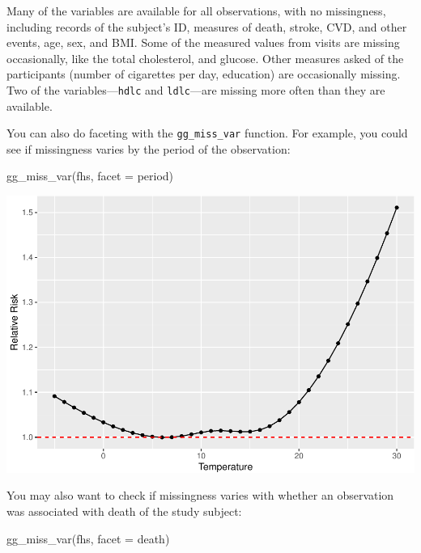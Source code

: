 \documentclass[
]{book}
\newenvironment{Shaded}{\begin{snugshade}}{\end{snugshade}}
\newcommand{\AttributeTok}[1]{\textcolor[rgb]{0.77,0.63,0.00}{#1}}
\newcommand{\FunctionTok}[1]{\textcolor[rgb]{0.00,0.00,0.00}{#1}}
\newcommand{\NormalTok}[1]{#1}
\begin{document}
Many of the variables are available for all observations, with no missingness,
including records of the subject's ID, measures of death, stroke, CVD, and other
events, age, sex, and BMI. Some of the measured values from visits are missing
occasionally, like the total cholesterol, and glucose. Other measures asked of
the participants (number of cigarettes per day, education) are occasionally
missing. Two of the variables---\texttt{hdlc} and \texttt{ldlc}---are missing more often than
they are available.

You can also do faceting with the \texttt{gg\_miss\_var} function. For
example, you could see if missingness varies by the period of the observation:

\begin{Shaded}
\begin{Highlighting}[]
\FunctionTok{gg\_miss\_var}\NormalTok{(fhs, }\AttributeTok{facet =}\NormalTok{ period)}
\end{Highlighting}
\end{Shaded}

\includegraphics{adv_epi_analysis_files/figure-latex/unnamed-chunk-75-1.pdf}

You may also want to check if missingness varies with whether an observation
was associated with death of the study subject:

\begin{Shaded}
\begin{Highlighting}[]
\FunctionTok{gg\_miss\_var}\NormalTok{(fhs, }\AttributeTok{facet =}\NormalTok{ death)}
\end{Highlighting}
\end{Shaded}
\end{document}

